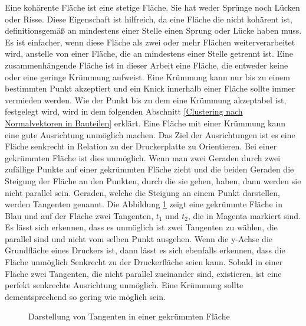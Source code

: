 Eine kohärente Fläche ist eine stetige Fläche. Sie hat weder Sprünge noch Lücken oder Risse. Diese Eigenschaft ist hilfreich, da eine Fläche die nicht kohärent ist, definitionsgemäß an mindestens einer Stelle einen Sprung oder Lücke haben muss. 
Es ist einfacher, wenn diese Fläche als zwei oder mehr Flächen weiterverarbeitet wird, anstelle von einer Fläche, die an mindestens einer Stelle getrennt ist. Eine zusammenhängende Fläche ist in dieser Arbeit eine Fläche, 
die entweder keine oder eine geringe Krümmung aufweist. Eine Krümmung kann nur bis zu einem bestimmten Punkt akzeptiert und ein Knick innerhalb einer Fläche sollte immer vermieden werden. Wie der Punkt bis zu dem eine Krümmung akzeptabel ist, festgelegt wird, wird 
in dem folgenden Abschnitt \ref{Clustering nach Normalvektoren in Bauteilen} erklärt. Eine Fläche mit einer Krümmung kann eine gute Ausrichtung unmöglich machen. 
Das Ziel der Ausrichtungen ist es eine Fläche senkrecht in Relation zu der Druckerplatte zu Orientieren. Bei einer gekrümmten Fläche ist dies unmöglich. Wenn man zwei Geraden durch zwei zufällige Punkte auf einer gekrümmten Fläche zieht 
und die beiden Geraden die Steigung der Fläche an den Punkten, durch die sie gehen, haben, dann werden sie nicht parallel sein. Geraden, welche die Steigung an einem Punkt darstellen, werden Tangenten genannt. 
Die Abbildung \ref{Darstellung von Tangenten in einer gekrümmten Fläche} zeigt eine gekrümmte Fläche in Blau und auf der Fläche zwei Tangenten, $t_1$ und $t_2$, 
die in Magenta markiert sind. Es lässt sich erkennen, dass es unmöglich ist zwei Tangenten zu wählen, die parallel sind und nicht vom selben Punkt ausgehen.
Wenn die y-Achse die Grundfläche eines Druckers ist, dann lässt es sich ebenfalls erkennen, dass die Fläche unmöglich Senkrecht zu der Druckerfläche seien kann. Sobald in einer Fläche zwei Tangenten, 
die nicht parallel zueinander sind, existieren, ist eine perfekt senkrechte Ausrichtung unmöglich. Eine Krümmung sollte dementsprechend so gering wie möglich sein. 

\begin{figure}[t]
        \centering
        \caption[Darstellung von Tangenten in einer gekrümmten Fläche]{Darstellung von Tangenten in einer gekrümmten Fläche}
            \label{Darstellung von Tangenten in einer gekrümmten Fläche}
    \end{figure}


